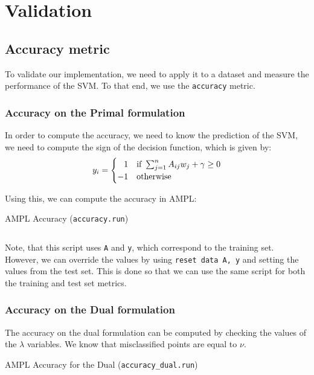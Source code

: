 \chapter{Validation}

\section{Accuracy metric}

To validate our implementation, we
need to apply it to a dataset and measure
the performance of the SVM. To that end,
we use the \texttt{accuracy} metric.

\subsection{Accuracy on the Primal formulation}

In order to compute the accuracy, we
need to know the prediction of the SVM, we
need to compute the sign of the decision
function, which is given by:
\begin{equation*}
	\label{eq:categories}
	y_i = \begin{cases}
        \hphantom{-}1 & \text{if } \sum_{j=1}^n A_{ij} w_j + \gamma \geq 0 \\
		-1 & \text{otherwise}
	\end{cases}
\end{equation*}

Using this, we can compute the accuracy in AMPL:
\begin{listing}[H]
	\caption{AMPL Accuracy (\texttt{accuracy.run})}
    \inputminted{ampl}{../ampl/accuracy.run}
\end{listing}

Note, that this script uses \texttt{A} and \texttt{y}, which
correspond to the training set. However, we can override
the values by using \texttt{reset data A, y}
and setting the values from the test set. This is done so
that we can use the same script for both the training and
test set metrics.

\subsection{Accuracy on the Dual formulation}%
\label{sec:accuracy-dual}

The accuracy on the dual formulation can be computed by
checking the values of the $\lambda$ variables. We know that
misclassified points are equal to $\nu$.
\begin{listing}[H]
	\caption{AMPL Accuracy for the Dual (\texttt{accuracy\_dual.run})}
    \label{lst:accuracy-dual}
    \inputminted{ampl}{../ampl/accuracy_dual.run}
\end{listing}

